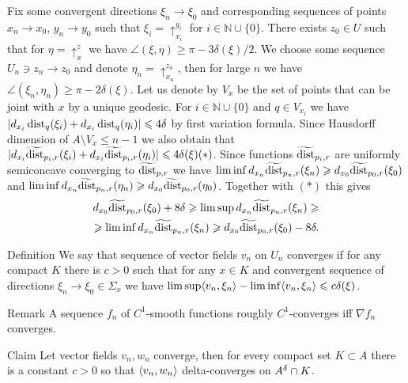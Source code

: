 Fix some convergent directions $\xi_n\to\xi_0$ and
corresponding sequences of points
$x_n\to x_0$, $y_n\to y_0$
such that  $\xi_i=\uparrow_{x_i}^{y_i}$ for $i\in\mathbb N\cup\{0\}$.
There exists $z_0 \in U$ such that for $\eta=\uparrow_x^z$ 
we have
$\angle(\xi,\eta)\ge \pi-3\delta(\xi)/2$.
We choose some sequence 
$U_n\ni z_n\to z_0$
and denote
$\eta_n=\uparrow_{x_n}^{z_n}$,
then for large $n$ we have $\angle(\xi_n,\eta_n)\ge \pi-2\delta(\xi)$.
Let us denote by $V_x$ be the set of points that can be joint with $x$
by a unique geodesic. For $i\in\mathbb N\cup\{0\}$ and
$q\in V_{x_i}$ we have $|d_{x_i} \operatorname{\rm dist}_q(\xi_i)+d_{x_i} \operatorname{\rm dist}_q(\eta_i)|\leqslant 4\delta$ by first
variation formula.
Since Hausdorff dimension of $A\setminus V_x\le n-1$ we also obtain
that
$|d_{x_i} \widetilde{\operatorname{\rm dist}}_{p_i,r}(\xi_i)+d_{x_i} \widetilde{\operatorname{\rm dist}}_{p_i,r}(\eta_i)|\leqslant 4\delta(\xi) (*)$.
Since functions
$\widetilde{\operatorname{\rm dist}}_{p_i,r}$ are uniformly semiconcave converging to
$\widetilde{\operatorname{\rm dist}}_{p,r}$ we have
$\liminf d_{x_n}\widetilde{\operatorname{\rm dist}}_{p_n,r}(\xi_n)\geqslant d_{x_0}\widetilde{\operatorname{\rm dist}}_{p_0,r}(\xi_0)$ and $\liminf d_{x_n}\widetilde{\operatorname{\rm dist}}_{p_n,r}(\eta_n)\geqslant d_{x_0}\widetilde{\operatorname{\rm dist}}_{p_0,r}(\eta_0)$.
Together with $(*)$ this gives
\begin{align*}
 d_{x_0}\widetilde{\operatorname{\rm dist}}_{p_0,r}(\xi_0)+8\delta\geqslant
\limsup d_{x_n}\widetilde{\operatorname{\rm dist}}_{p_n,r}(\xi_n)\geqslant\\
\geqslant
\liminf d_{x_n}\widetilde{\operatorname{\rm dist}}_{p_n,r}(\xi_n)\geqslant d_{x_0}\widetilde{\operatorname{\rm dist}}_{p_0,r}(\xi_0)-8\delta.
\end{align*}

\begin{thm}{Definition}
We say that sequence of vector fields $v_n$ on $U_n$
converges if for any compact $K$ there is $c>0$ such that
for any $x\in K$ and convergent sequence of directions $\xi_n\to\xi_0\in \Sigma_x$ we have
$\limsup \langle v_n,\xi_n\rangle-\liminf \langle v_n,\xi_n\rangle\leqslant c\delta(\xi)$.

\end{thm}

\begin{thm}{Remark}
A sequence $f_n$ of $C^1$-smooth functions roughly $C^1$-converges
iff $\nabla f_n$ converges.

\end{thm}


\begin{thm}{Claim}\label{lem:scalprod}
Let vector fields $v_n, w_n$ converge, then for every compact
set $K\subset A$ there is a constant $c>0$ so that
$\langle v_n, w_n\rangle$ delta-converges on $A^\delta\cap K$.
\end{thm}


